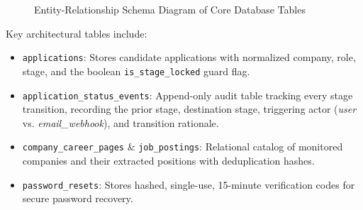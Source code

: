 \begin{figure}[htbp]
\caption{Entity-Relationship Schema Diagram of Core Database Tables}
\label{fig:er_diagram}
\end{figure}

Key architectural tables include:
\begin{itemize}
    \item \texttt{applications}: Stores candidate applications with normalized company, role, stage, and the boolean \texttt{is\_stage\_locked} guard flag.
    \item \texttt{application\_status\_events}: Append-only audit table tracking every stage transition, recording the prior stage, destination stage, triggering actor (\textit{user} vs. \textit{email\_webhook}), and transition rationale.
    \item \texttt{company\_career\_pages} \& \texttt{job\_postings}: Relational catalog of monitored companies and their extracted positions with deduplication hashes.
    \item \texttt{password\_resets}: Stores hashed, single-use, 15-minute verification codes for secure password recovery.
\end{itemize}

